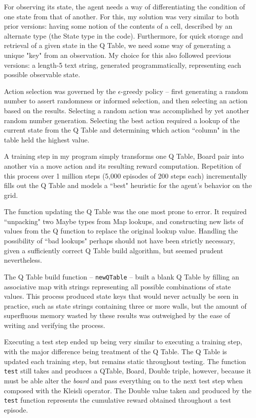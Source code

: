 \documentclass[12pt,a4paper]{article}
\begin{document}
		\par For observing its state, the agent needs a way of differentiating the condition of one state from that of another. For this, my solution was very similar to both prior versions: having some notion of the contents of a cell, described by an alternate type (the State type in the code). Furthermore, for quick storage and retrieval of a given state in the Q Table, we need some way of generating a unique "key" from an observation. My choice for this also followed previous versions: a length-5 text string, generated programmatically, representing each possible observable state.
		\par Action selection was governed by the $\epsilon$-greedy policy -- first generating a random number to assert randomness or informed selection, and then selecting an action based on the results. Selecting a random action was accomplished by yet another random number generation. Selecting the best action required a lookup of the current state from the Q Table and determining which action ``column" in the table held the highest value. 
		\par A training step in my program simply transforms one Q Table, Board pair into another via a move action and its resulting reward computation. Repetition of this process over 1 million steps (5,000 episodes of 200 steps each) incrementally fills out the Q Table and models a ``best" heuristic for the agent's behavior on the grid.
		\par The function updating the Q Table was the one most prone to error. It required ``unpacking" two Maybe types from Map lookups, and constructing new lists of values from the Q function to replace the original lookup value. Handling the possibility of ``bad lookups" perhaps should not have been strictly necessary, given a sufficiently correct Q Table build algorithm, but seemed prudent nevertheless.
		\par The Q Table build function -- \texttt{newQTable} -- built a blank Q Table by filling an associative map with strings representing all possible combinations of state values. This process produced state keys that would never actually be seen in practice, such as state strings containing three or more walls, but the amount of superfluous memory wasted by these results was outweighed by the ease of writing and verifying the process.
		\par Executing a test step ended up being very similar to executing a training step, with the major difference being treatment of the Q Table. The Q Table is updated each training step, but remains static throughout testing. The function \texttt{test} still takes and produces a QTable, Board, Double triple, however, because it must be able alter the \textit{board} and pass everything on to the next test step when composed with the Kleisli operator. The Double value taken and produced by the \texttt{test} function represents the cumulative reward obtained throughout a test episode. 
		
\end{document}
